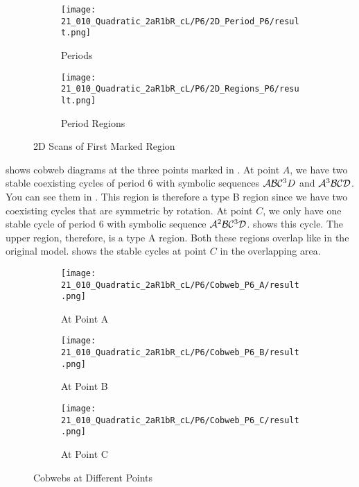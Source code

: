 \begin{figure}
    \centering
    \begin{subfigure}{0.4\textwidth}
        \centering
        \texttt{[image: 21\_010\_Quadratic\_2aR1bR\_cL/P6/2D\_Period\_P6/result.png]}
        \caption{Periods}
        \label{fig:quadratic.full.2aR1bR_cL.2d.1}
    \end{subfigure}
    \begin{subfigure}{0.4\textwidth}
        \centering
        \texttt{[image: 21\_010\_Quadratic\_2aR1bR\_cL/P6/2D\_Regions\_P6/result.png]}
        \caption{Period Regions}
        \label{fig:quadratic.regions.2aR1bR_cL.2d.1}
    \end{subfigure}
    \caption{2D Scans of First Marked Region}
\end{figure}

 shows cobweb diagrams at the three points marked in .
At point $A$, we have two stable coexisting cycles of period 6 with symbolic sequences $\mathcal{A}\mathcal{B}\mathcal{C}^3D$ and $\mathcal{A}^3\mathcal{B}\mathcal{C}\mathcal{D}$.
You can see them in .
This region is therefore a type B region since we have two coexisting cycles that are symmetric by rotation.
At point $C$, we only have one stable cycle of period 6 with symbolic sequence $\mathcal{A}^2\mathcal{B}\mathcal{C}^3\mathcal{D}$.
 shows this cycle.
The upper region, therefore, is a type A region.
Both these regions overlap like in the original model.
 shows the stable cycles at point $C$ in the overlapping area.

\begin{figure}
    \centering
    \begin{subfigure}{0.3\textwidth}
        \centering
        \texttt{[image: 21\_010\_Quadratic\_2aR1bR\_cL/P6/Cobweb\_P6\_A/result.png]}
        \caption{At Point A}
        \label{fig:quad.full.2aR1bR_cL.1.CobwebA}
    \end{subfigure}
    \begin{subfigure}{0.3\textwidth}
        \centering
        \texttt{[image: 21\_010\_Quadratic\_2aR1bR\_cL/P6/Cobweb\_P6\_B/result.png]}
        \caption{At Point B}
        \label{fig:quad.full.2aR1bR_cL.1.CobwebB}
    \end{subfigure}
    \begin{subfigure}{0.3\textwidth}
        \centering
        \texttt{[image: 21\_010\_Quadratic\_2aR1bR\_cL/P6/Cobweb\_P6\_C/result.png]}
        \caption{At Point C}
        \label{fig:quad.full.2aR1bR_cL.1.CobwebC}
    \end{subfigure}
    \caption{Cobwebs at Different Points}
    \label{fig:quad.full.2aR1bR_cL.1.Cobwebs}
\end{figure}

